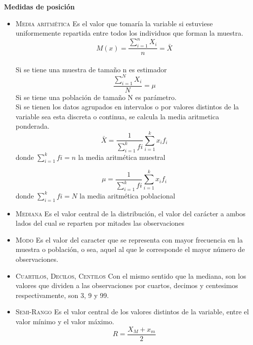 \documentclass[10pt,a4paper]{article}
\begin{document}
	\textbf{Medidas de posición}
	\begin{itemize}
		\item \textsc{Media aritmética} Es el valor que tomaría la variable si estuviese uniformemente repartida entre todos los individuos que forman la muestra.
		\begin{equation}
			M(x)=\frac{\sum_{i=1}^{n}X_i}{n}=\bar{X}
		\end{equation}\\
		Si se tiene una muestra de tamaño n es estimador
		\begin{equation}
			\frac{\sum_{i=1}^{N}X_i}{N}=\mu
		\end{equation}
		Si se tiene una población de tamaño N es parámetro.\\
		Si se tienen los datos agrupados en intervalos o por valores distintos de la variable sea esta discreta o continua, se calcula la media aritmetica ponderada.
		\begin{equation}
			\bar{X}=\frac{1}{\sum_{i=1}^{k}fi} \sum_{i=1}^{k}x_i f_i
		\end{equation}
		donde $\sum_{i=1}^{k}fi=n$ la media aritmética muestral
		
		\begin{equation}
			\mu=\frac{1}{\sum_{i=1}^{k}fi}\sum_{i=1}^{k}x_i f_i
		\end{equation}
		donde $\sum_{i=1}^{k}fi=N$ la media aritmética poblacional
		\item \textsc{Mediana} Es el valor central de la distribución, el valor del carácter a ambos lados del cual se reparten por mitades las observaciones\\
		\item \textsc{Modo} Es el valor del caracter que se representa con mayor frecuencia en la muestra o población, o sea, aquel al que le corresponde el mayor número de observaciones.\\
		\item \textsc{Cuartilos, Decilos, Centilos} Con el mismo sentido que la mediana, son los valores que dividen a las observaciones por cuartos, decimos y centesimos respectivamente, son 3, 9 y 99.\\
		\item \textsc{Semi-Rango} Es el valor central de los valores distintos de la variable, entre el valor mínimo y el valor máximo.
		\begin{equation}
		R=\frac{X_M+x_m}{2}
		\end{equation}
	\end{itemize}
\end{document}
